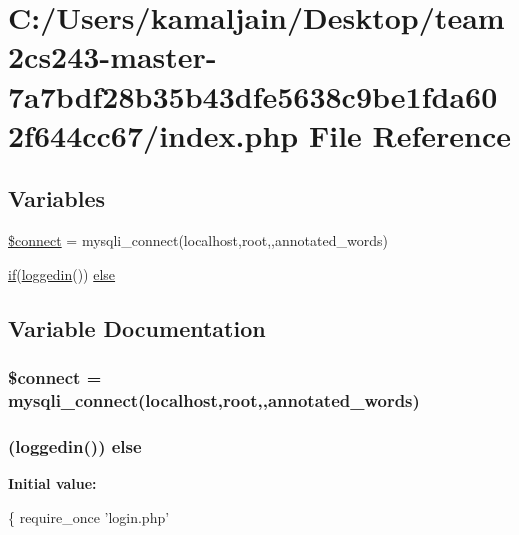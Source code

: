 \hypertarget{index_8php}{}\section{C\+:/\+Users/kamaljain/\+Desktop/team2cs243-\/master-\/7a7bdf28b35b43dfe5638c9be1fda602f644cc67/index.php File Reference}
\label{index_8php}
\subsection*{Variables}
\begin{DoxyCompactItemize}
\item 
\hyperlink{index_8php_a956617395b85e98d907df712f6d0d3f7}{\$connect} = mysqli\+\_\+connect(\textquotesingle{}localhost\textquotesingle{},\textquotesingle{}root\textquotesingle{},\textquotesingle{}\textquotesingle{},\textquotesingle{}annotated\+\_\+words\textquotesingle{})
\item 
\hyperlink{login_8php_a6cf3ef86567b2d2e235730bbe61cb311}{if}(\hyperlink{core_8php_aab6c166eb2634a4ddbacc2f19417fe5c}{loggedin}()) \hyperlink{index_8php_a13958a06b5193d68fe67a95a8fd4cc21}{else}
\end{DoxyCompactItemize}


\subsection{Variable Documentation}
\subsubsection[{\texorpdfstring{\$connect}{$connect}}]{\setlength{\rightskip}{0pt plus 5cm}\$connect = mysqli\+\_\+connect(\textquotesingle{}localhost\textquotesingle{},\textquotesingle{}root\textquotesingle{},\textquotesingle{}\textquotesingle{},\textquotesingle{}annotated\+\_\+words\textquotesingle{})}\hypertarget{index_8php_a956617395b85e98d907df712f6d0d3f7}{}\label{index_8php_a956617395b85e98d907df712f6d0d3f7}
\subsubsection[{\texorpdfstring{else}{else}}]{ ({\bf loggedin}()) else}\hypertarget{index_8php_a13958a06b5193d68fe67a95a8fd4cc21}{}\label{index_8php_a13958a06b5193d68fe67a95a8fd4cc21}
{\bfseries Initial value\+:}
\begin{DoxyCode}
\{
  require\_once \textcolor{stringliteral}{'login.php'}
\end{DoxyCode}
